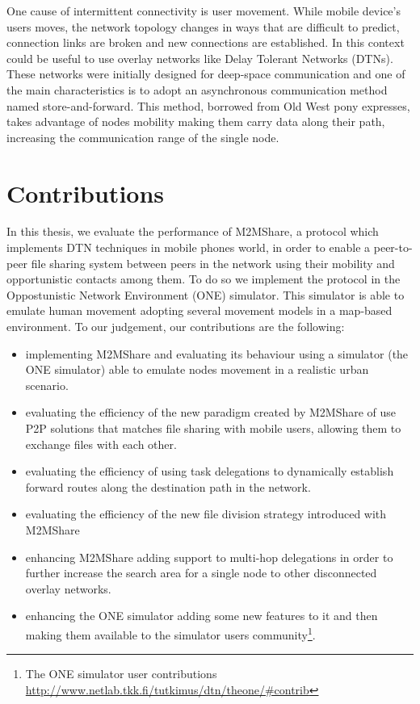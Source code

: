 One cause of intermittent connectivity is user movement. While mobile device's users moves, the network topology changes in ways that are difficult to predict, connection links are broken and new connections are established. In this context could be useful to use overlay networks like Delay Tolerant Networks (DTNs). These networks were initially designed for deep-space communication and one of the main characteristics is to adopt an asynchronous communication method named store-and-forward. This method, borrowed from Old West pony expresses, takes advantage of nodes mobility making them carry data along their path, increasing the communication range of the single node.



\section{Contributions}
In this thesis, we evaluate the performance of M2MShare, a protocol which implements DTN techniques in mobile phones world, in order to enable a peer-to-peer file sharing system between peers in the network using their mobility and opportunistic contacts among them. To do so we implement the protocol in the Oppostunistic Network Environment (ONE) simulator. This simulator is able to emulate human movement adopting several movement models in a map-based environment. To our judgement, our contributions are the following:
\begin{itemize}
\item implementing M2MShare and evaluating its behaviour using a simulator (the ONE simulator) able to emulate nodes movement in a realistic urban scenario.
\item evaluating the efficiency of the new paradigm created by M2MShare of use P2P solutions that matches file sharing with mobile users, allowing them to exchange files with each other.
\item evaluating the efficiency of using task delegations to dynamically establish forward routes along the destination path in the network.
\item evaluating the efficiency of the new file division strategy introduced with M2MShare 
\item enhancing M2MShare adding support to multi-hop delegations in order to further increase the search area for a single node to other disconnected overlay networks.
\item enhancing the ONE simulator adding some new features to it and then making them available to the simulator users community\footnote{The ONE simulator user contributions \href{http://www.netlab.tkk.fi/tutkimus/dtn/theone/#contrib}{http://www.netlab.tkk.fi/tutkimus/dtn/theone/#contrib}}.
\end{itemize}

